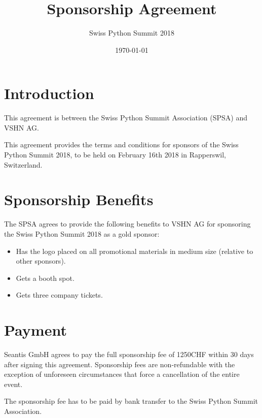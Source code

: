 \documentclass[11pt,enlargefirstpage=true,headlines=4]{scrartcl}
\title{Sponsorship Agreement}
\subtitle{Swiss Python Summit 2018}
\date{\today} %
\begin{document}
    \maketitle

    \section{Introduction}

    This agreement is between the Swiss Python Summit Association (SPSA) and
    VSHN AG.

    This agreement provides the terms and conditions for sponsors of the Swiss
    Python Summit 2018, to be held on February 16th 2018 in Rapperswil,
    Switzerland.

    \section{Sponsorship Benefits}

    The SPSA agrees to provide the following benefits to VSHN AG for sponsoring
    the Swiss Python Summit 2018 as a gold sponsor:

    \begin{itemize}
        \item Has the logo placed on all promotional materials in medium size (relative to other sponsors).
        \item Gets a booth spot.
        \item Gets three company tickets.
    \end{itemize}

    \section{Payment}

    Seantis GmbH agrees to pay the full sponsorship fee of 1250CHF within 30 days
    after signing this agreement. Sponsorship fees are non‐refundable with the
    exception of unforeseen circumstances that force a cancellation of the entire
    event.

    The sponsorship fee has to be paid by bank transfer to the Swiss Python
    Summit Association.

    \quad
\end{document}
